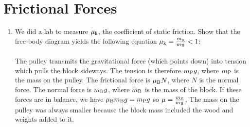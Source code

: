 \documentclass[10pt]{article}
\begin{document}
\section{Frictional Forces}
\begin{enumerate}
\item We did a lab to measure $\mu_{\rm k}$, the coefficient of static friction.  Show that the free-body diagram yields the following equation $\mu_{\rm k} = \frac{m_{\rm p}}{m_{\rm B}} < 1$: \\ \\
The pulley transmits the gravitational force (which points down) into tension which pulls the block sideways.  The tension is therefore $m_{\rm P} g$, where $m_{\rm P}$ is the mass on the pulley.  The frictional force is $\mu_{\rm B}N$, where $N$ is the normal force.  The normal force is $m_{\rm B}g$, where $m_{\rm B}$ is the mass of the block.  If these forces are in balance, we have $\mu_{\rm B}m_{\rm B}g = m_{\rm P} g$ so $\mu = \frac{m_{\rm P}}{m_{\rm B}}$.  The mass on the pulley was always smaller because the block mass included the wood and weights added to it.
\end{enumerate}
\end{document}
